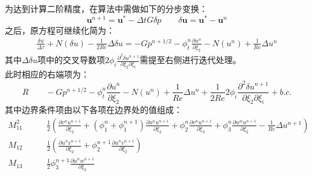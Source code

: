 \documentclass{ctexart}
\begin{document}
	为达到计算二阶精度，在算法中需做如下的分步变换：
	\begin{equation}
	\boldsymbol{u}^{n+1} = \boldsymbol{u}^* - \varDelta tG\delta p \qquad \delta \boldsymbol{u} = \boldsymbol{u}^* - \boldsymbol{u}^n
	\end{equation}
	之后，原方程可继续化简为：
	\begin{equation}
	\begin{split}
	\frac{\delta u}{\varDelta\tau} + N(\delta u) -\frac{1}{2Re}\varDelta \delta u= -Gp^{n+1/2} - \phi_t^n\frac{\partial u^n}{\partial\xi_2} - N(u^n) + \frac{1}{Re}\varDelta u^n
	\end{split}
	\end{equation}
	其中$\varDelta \delta u$项中的交叉导数项$\displaystyle2\phi_i\frac{\partial^2\delta u^{n+1}}{\partial\xi_2\partial\xi_i}$需提至右侧进行迭代处理。\\
	此时相应的右端项为：
	\begin{equation}
	R \qquad -Gp^{n+1/2} - \phi_t^n\frac{\partial u^n}{\partial\xi_2} - N(u^n) + \frac{1}{Re}\varDelta u^n + \frac{1}{2Re}2\phi_i\frac{\partial^2\delta u^{n+1}}{\partial\xi_2\partial\xi_i} + b.c.
	\end{equation}
	其中边界条件项由以下各项在边界处的值组成：
	\begin{equation}
	\begin{split}
	M_{11}^2 \qquad & \frac{1}{2}(\frac{\partial v^nu^{n+1}}{\partial \xi_2} + (\phi_1^n + \phi_1^{n+1})\frac{\partial u^nu^{n+1}}{\partial \xi_2} + \phi_2^n\frac{\partial v^nu^{n+1}}{\partial\xi_2} + \phi_3^n\frac{\partial w^nu^{n+1}}{\partial\xi_2} -\frac{1}{Re}\varDelta u^{n+1})\\
	M_{12} \qquad & \frac{1}{2}(\frac{\partial u^nv^{n+1}}{\partial\xi_2} + \phi_2^{n+1}\frac{\partial u^nv^{n+1}}{\partial\xi_2})\\
	M_{13} \qquad & \frac{1}{2} \phi_3^{n+1}\frac{\partial u^nw^{n+1}}{\partial\xi_2}\\
	\end{split}
	\end{equation}
\end{document}
